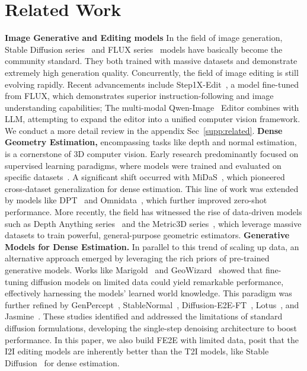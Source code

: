 \documentclass{article} %
\begin{document}
\section{Related Work}
\vspace{-0.5em}
\textbf{Image Generative and Editing models}
In the field of image generation, Stable Diffusion series~\citep{sd} and FLUX series~\citep{flux} models have basically become the community standard. They both trained with massive datasets and demonstrate extremely high generation quality. Concurrently, the field of image editing is still evolving rapidly. Recent advancements include Step1X-Edit~\citep{step}, a model fine-tuned from FLUX, which demonstrates superior instruction-following and image understanding capabilities; The multi-modal Qwen-Image~\citep{qwenimage} Editor combines with LLM, attempting to expand the editor into a unified computer vision framework. We conduct a more detail review in the appendix Sec~\ref{supp:related}.
\newline\textbf{Dense Geometry Estimation,} encompassing tasks like depth and normal estimation, is a cornerstone of 3D computer vision. Early research predominantly focused on supervised learning paradigms, where models were trained and evaluated on specific datasets~\citep{eigen,eigen2}. A significant shift occurred with MiDaS~\citep{midas}, which pioneered cross-dataset generalization for dense estimation. This line of work was extended by models like DPT~\citep{dpt} and Omnidata~\citep{omini}, which further improved zero-shot performance. More recently, the field has witnessed the rise of data-driven models such as Depth Anything series~\citep{dam1,dam2} and the Metric3D series~\citep{metric3d}, which leverage massive datasets to train powerful, general-purpose geometric estimators.
\newline
\textbf{Generative Models for Dense Estimation.}
In parallel to this trend of scaling up data, an alternative approach emerged by leveraging the rich priors of pre-trained generative models. Works like Marigold~\citep{marigold} and GeoWizard~\citep{geowizard} showed that fine-tuning diffusion models on limited data could yield remarkable performance, effectively harnessing the models' learned world knowledge. This paradigm was further refined by GenPercept~\citep{genprecept}, StableNormal~\citep{stablen}, Diffusion-E2E-FT~\citep{e2eft}, Lotus~\citep{lotus}, and Jasmine~\citep{jasmine}. These studies identified and addressed the limitations of standard diffusion formulations, developing the single-step denoising architecture to boost performance. In this paper, we also build FE2E with limited data, posit that the I2I editing models are inherently better than the T2I models, like Stable Diffusion~\citep{sd} for dense estimation.
\end{document}
